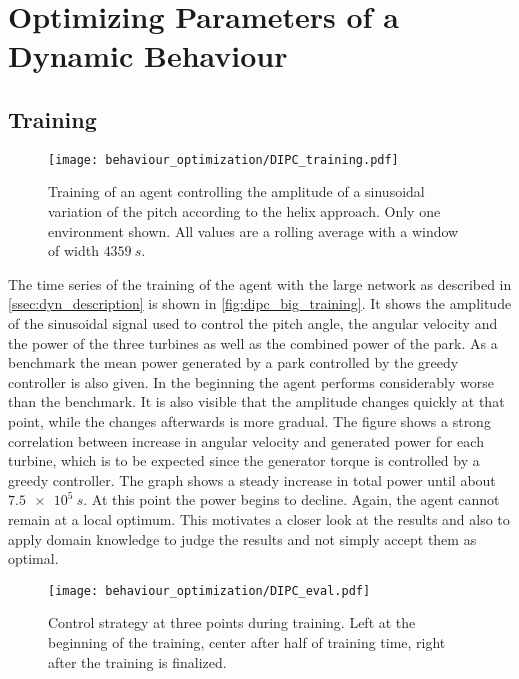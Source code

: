\section{Optimizing Parameters of a Dynamic Behaviour}
\subsection{Training}
\begin{figure}[h]
	\centering
	\texttt{[image: behaviour\_optimization/DIPC\_training.pdf]}
	\caption{ Training of an agent controlling the amplitude of a sinusoidal variation of the pitch according to the helix approach. Only one environment shown. All values are a rolling average with a window of width $\SI{4359}{s}$. }
	\label{fig:dipc_big_training}
\end{figure}
The time series of the training of the agent with the large network as described in \autoref{ssec:dyn_description} is shown in \autoref{fig:dipc_big_training}. It shows the amplitude of the sinusoidal signal used to control the pitch angle, the angular velocity and the power of the three turbines as well as the combined power of the park. As a benchmark the mean power generated by a park controlled by the greedy controller is also given. In the beginning the agent performs considerably worse than the benchmark. It is also visible that the amplitude changes quickly at that point, while the changes afterwards is more gradual. The figure shows a strong correlation between increase in angular velocity and generated power for each turbine, which is to be expected since the generator torque is controlled by a greedy controller. The graph shows a steady increase in total power until about $\SI{7.5e5}{s}$. At this point the power begins to decline. Again, the agent cannot remain at a local optimum. This motivates a closer look at the results and also to apply domain knowledge to judge the results and not simply accept them as optimal.
\begin{figure}[h]
	\centering
	\texttt{[image: behaviour\_optimization/DIPC\_eval.pdf]}
	\caption{ Control strategy at three points during training. Left at the beginning of the training, center after half of training time, right after the training is finalized.}
	\label{fig:dipc_big_strategies}
\end{figure}
